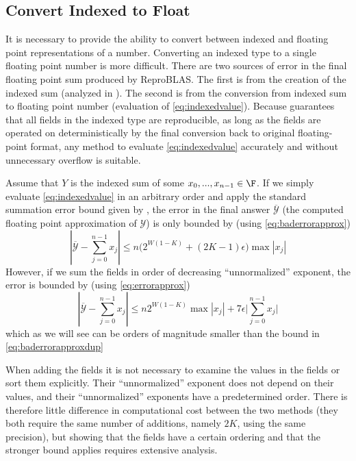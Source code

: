 \subsection{Convert Indexed to Float}
    \label{sec:primitiveops_conv2float}
    It is necessary to provide the ability to convert between indexed and
    floating point representations of a number.
    Converting an indexed type to a single floating point number is more
    difficult. There are two sources of error in the final floating point sum
    produced by ReproBLAS. The first is from the creation of the indexed sum
    (analyzed in \cite{repsum}). The second is from the conversion from indexed
    sum to floating point number (evaluation of  \eqref{eq:indexedvalue}).
    Because \cite{repsum} guarantees that all fields in the indexed type are
    reproducible, as long as the fields are operated on deterministically
    by the final conversion back to original floating-point format,
    any method to evaluate  \eqref{eq:indexedvalue} accurately and without
    unnecessary overflow is suitable.

    Assume that $Y$ is the indexed sum of some $x_0, ..., x_{n - 1} \in \F$. If
    we simply evaluate \eqref{eq:indexedvalue} in an arbitrary order and apply
    the standard summation error bound given by \cite{higham}, the error in the
    final answer $\overline{\mathcal{Y}}$ (the computed floating point
    approximation of $\mathcal{Y}$) is only bounded by (using
    \eqref{eq:baderrorapprox})
    \begin{equation}
      |\overline{\mathcal{Y}} - \sum_{j=0}^{n-1}x_j| \leq n \bigl(2^{W  (1 - K)} + (2  K - 1)  \epsilon\bigr)\max|x_j|
      \label{eq:baderrorapproxdup}
    \end{equation}
    However, if we sum the fields in order of decreasing ``unnormalized''
    exponent, the error is bounded by (using  \eqref{eq:errorapprox})
    \begin{equation}
      |\overline{\mathcal{Y}} - \sum_{j=0}^{n-1}x_j| \leq n 2^{W  (1 - K)}\max|x_j|  + 7 \epsilon \bigl|\sum\limits_{j = 0}^{n - 1} x_j\bigr|
      \label{eq:errorapproxdup}
    \end{equation}
    which as we will see can be orders of magnitude smaller than the bound in \eqref{eq:baderrorapproxdup}

    When adding the fields it is not necessary to examine the values in the
    fields or sort them explicitly. Their ``unnormalized'' exponent does not
    depend on their values, and their ``unnormalized'' exponents have a
    predetermined order. There is therefore little difference in computational
    cost between the two methods (they both require the same number of
    additions, namely $2 K$, using the same precision), but showing that the
    fields have a certain ordering and that the stronger bound applies requires
    extensive analysis.

